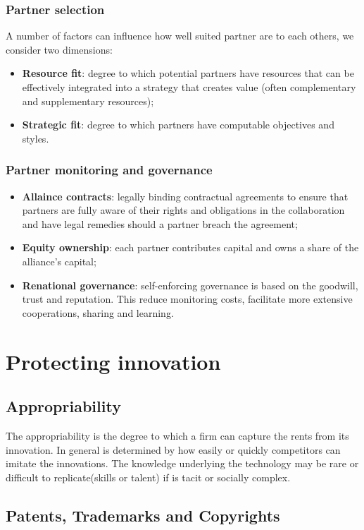 \documentclass[12pt]{article}
\begin{document}
\subsubsection{Partner selection}
A number of factors can influence how well suited partner are to each others, we consider two dimensions:
\begin{itemize}
    \item \textbf{Resource fit}: degree to which potential partners have resources that can be effectively integrated into a strategy that creates value (often complementary and supplementary resources);
    \item \textbf{Strategic fit}: degree to which partners have computable objectives and styles.
\end{itemize}
\subsubsection{Partner monitoring and governance}
\begin{itemize}
    \item \textbf{Allaince contracts}: legally binding contractual agreements to ensure that partners are fully aware of their rights and obligations in the collaboration and have legal remedies should a partner breach the agreement;
    \item \textbf{Equity ownership}: each partner contributes capital and owns a share of the alliance's capital;
    \item \textbf{Renational governance}: self-enforcing governance is based on the goodwill, trust and reputation.
    This reduce monitoring costs, facilitate more extensive cooperations, sharing and learning.
\end{itemize}
\section{Protecting innovation}
\subsection{Appropriability}
The appropriability is the degree to which a firm can capture the rents from its innovation. In general is determined by how easily or quickly competitors can imitate the innovations.
The knowledge underlying the technology may be rare or difficult to replicate(skills or talent) if is tacit or socially complex.
\subsection{Patents, Trademarks and Copyrights}
\end{document}
